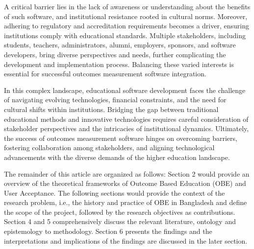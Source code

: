 \documentclass[journal,onecolumn]{IEEEtran}
\begin{document}
A critical barrier lies in the lack of awareness or understanding about the benefits of such software, and institutional resistance rooted in cultural norms. Moreover, adhering to regulatory and accreditation requirements becomes a driver, ensuring institutions comply with educational standards. Multiple stakeholders, including students, teachers, administrators, alumni, employers, sponsors, and software developers, bring diverse perspectives and needs, further complicating the development and implementation process. Balancing these varied interests is essential for successful outcomes measurement software integration.  

In this complex landscape, educational software development faces the challenge of navigating evolving technologies, financial constraints, and the need for cultural shifts within institutions. Bridging the gap between traditional educational methods and innovative technologies requires careful consideration of stakeholder perspectives and the intricacies of institutional dynamics. Ultimately, the success of outcomes measurement software hinges on overcoming barriers, fostering collaboration among stakeholders, and aligning technological advancements with the diverse demands of the higher education landscape.

The remainder of this article are organized as follows: Section 2 would provide an overview of the theoretical frameworks of Outcome Based Education (OBE) and User Acceptance. The following sections would provide the context of the research problem, i.e., the history and practice of OBE in Bangladesh and define the scope of the project, followed by the research objectives as contributions. Section 4 and 5 comprehensively discuss the relevant literature, ontology and epistemology to methodology. Section 6 presents the findings and the interpretations and implications of the findings are discussed in the later section.






%
%
\end{document}
